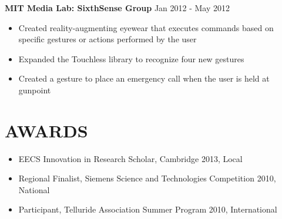 \documentclass{res}
\begin{document}
\begin{resume}
	{\bf MIT Media Lab: SixthSense Group} \hfill Jan 2012 - May 2012
	\begin{itemize} \itemsep -3pt
	\item Created reality-augmenting eyewear that executes commands based on specific gestures or actions performed by the user
	\item Expanded the Touchless library to recognize four new gestures
	\item Created a gesture to place an emergency call when the user is held at gunpoint
	\end{itemize}

%

\section{\large AWARDS}
	\begin{itemize} \itemsep -3pt
	\item EECS Innovation in Research Scholar, Cambridge \hfill 2013, Local
	\item Regional Finalist, Siemens Science and Technologies Competition \hfill 2010, National		
	\item Participant, Telluride Association Summer Program \hfill 2010, International
	\end{itemize}



\end{resume}
\end{document}
